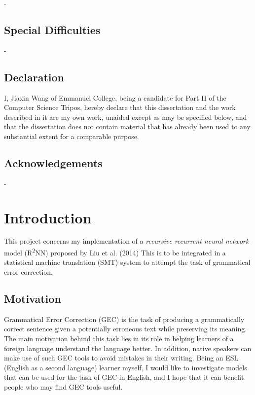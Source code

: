 \documentclass[12pt,a4paper,twoside,openright]{report}
\begin{document}
-

\section*{Special Difficulties}

-
 
\newpage
\section*{Declaration}

I, Jiaxin Wang of Emmanuel College, being a candidate for Part II of the Computer
Science Tripos, hereby declare that this dissertation and the work described in 
it are my own work, unaided except as may be specified below, and that the dissertation
does not contain material that has already been used to any substantial
extent for a comparable purpose.

\bigskip
{}

\medskip
{}

\tableofcontents

\listoffigures

\newpage
\section*{Acknowledgements}

-

\listoftodos

\pagestyle{headings}

\chapter{Introduction}

This project concerns my implementation of a \textit{recursive recurrent neural network} model (R\textsuperscript{2}NN) proposed by Liu et al. (2014) \cite{r2nn} This is to be integrated in a statistical machine translation (SMT) system to attempt the task of grammatical error correction. 

\section{Motivation}

Grammatical Error Correction (GEC) is the task of producing a grammatically correct sentence given a potentially erroneous text while preserving its meaning. The main motivation behind this task lies in its role in helping learners of a foreign language understand the language better. In addition, native speakers can make use of such GEC tools to avoid mistakes in their writing. Being an ESL (English as a second language) learner myself, I would like to investigate models that can be used for the task of GEC in English, and I hope that it can benefit people who may find GEC tools useful.
\end{document}
